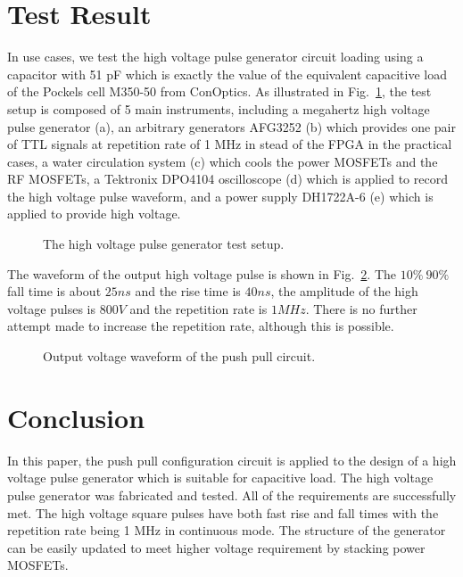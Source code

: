 \documentclass[aip,rsi,reprint,graphicx]{revtex4-1} %
\begin{document}
\section{Test Result}
In use cases, we test the high voltage pulse generator circuit loading using a capacitor with 51 pF which is exactly the value of the equivalent capacitive load of the Pockels cell M350-50 from ConOptics.  As illustrated in Fig.~\ref{FIG3}, the test setup is composed of 5 main instruments, including a megahertz high voltage pulse generator (a), an arbitrary generators AFG3252 (b) which provides one pair of TTL signals at repetition rate of 1 MHz in stead of the FPGA in the practical cases, a water circulation system (c) which cools the power MOSFETs and the RF MOSFETs,
a Tektronix DPO4104 oscilloscope (d) which is applied to record the high voltage pulse waveform, and a power supply DH1722A-6 (e) which is applied to provide high voltage.
\begin{figure}[hbt]
\caption{The high voltage pulse generator test setup. \label{FIG3}}%
\end{figure}
The waveform of the output high voltage pulse is shown in Fig.~\ref{Fig4}. The $10\%~90\%$ fall time is about $25ns$ and the rise time is $40 ns$, the amplitude of the high voltage pulses is $800V$ and the repetition rate is $1MHz$. There is no further attempt made to increase the repetition rate, although this is possible.
\begin{figure}[hbt]
\caption{Output voltage waveform of the push pull circuit.\label{Fig4}}%
\end{figure}

\section{Conclusion}
In this paper, the push pull configuration circuit is applied to the design of a high voltage pulse generator which is suitable for capacitive load. The high voltage pulse generator was fabricated and tested. All of the requirements are successfully met. The high voltage square pulses have both fast rise and fall times with the repetition rate being 1 MHz in continuous mode. The structure of the generator can be easily updated to meet higher voltage requirement by stacking power MOSFETs\cite{baker1992stacking,baker1993series}.
\end{document}
